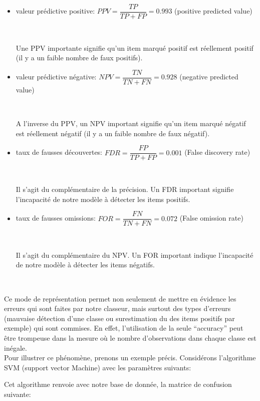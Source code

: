 \documentclass[a4paper]{report}
\begin{document}
\begin{itemize}
\item valeur prédictive positive: $PPV=\dfrac{TP}{TP+FP}=0.993$  (positive predicted value)

~\par

Une PPV importante signifie qu'un item marqué positif est réellement positif (il y a un faible nombre de faux positifs). 

\item valeur prédictive négative: $NPV=\dfrac{TN}{TN+FN}=0.928$ (negative predicted value)

~\par

A l'inverse du PPV, un NPV important signifie qu'un item marqué négatif est réellement négatif (il y a un faible nombre de faux négatif).


\item taux de fausses découvertes: $FDR=\dfrac{FP}{TP+FP}=0.001$   (False discovery rate)

~\par

Il s'agit du complémentaire de la précision. Un FDR important signifie l'incapacité de notre modèle à détecter les items positifs. 

\item taux de fausses omissions: $FOR=\dfrac{FN}{TN+FN}=0.072$ (False omission rate)

~\par

Il s'agit du complémentaire du NPV. Un FOR important indique l'incapacité de notre modèle à détecter les items négatifs. 

\end{itemize}

~\par

Ce mode de représentation permet non seulement de mettre en évidence les erreurs qui sont faites par notre classeur, mais surtout des types d'erreurs (mauvaise détection d'une classe ou surestimation du des items positifs par exemple) qui sont commises. En effet, l'utilisation de la seule “accuracy” peut être trompeuse dans la mesure où le nombre d'observations dans chaque classe est inégale. \\
\medskip
Pour illustrer ce phénomène, prenons un exemple précis. Considérons l'algorithme SVM (support vector Machine) avec les paramètres suivants:
\medbreak

\begin{center}
\noindent
{}
\end{center}
\medbreak
Cet algorithme renvoie avec notre base de donnée, la matrice de confusion suivante: 
\end{document}
